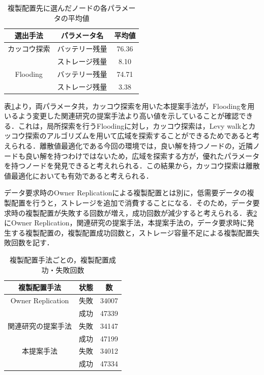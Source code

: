 \documentclass[11pt]{jreport}
\begin{document}
\begin{table}[H]
	\begin{center}
	\caption{複製配置先に選んだノードの各パラメータの平均値}
	\begin{tabular}{ | c | c | c | } \hline
	選出手法 & パラメータ名 & 平均値 \\ \hline \hline
	カッコウ探索 & バッテリー残量 & 76.36 \\ \cline{2-3}
		     & ストレージ残量 & 8.10 \\ \hline
	Flooding & バッテリー残量 & 74.71 \\ \cline{2-3}
		     & ストレージ残量 & 3.38 \\ \hline
	\end{tabular}
	\label{tab:node}
	\end{center}
\end{table}

\par 表\ref{tab:node}より，両パラメータ共，カッコウ探索を用いた本提案手法が，Floodingを用いるよう変更した関連研究の提案手法より高い値を示していることが確認できる．これは，局所探索を行うFloodingに対し，カッコウ探索は，Levy walkとカッコウ探索のアルゴリズムを用いて広域を探索することができるためであると考えられる．離散値最適化である今回の環境では，良い解を持つノードの，近隣ノードも良い解を持つわけではないため，広域を探索する方が，優れたパラメータを持つノードを発見できると考えれられる．この結果から，カッコウ探索は離散値最適化においても有効であると考えられる．
\par データ要求時のOwner Replicationによる複製配置とは別に，低需要データの複製配置を行うと，ストレージを追加で消費することになる．そのため，データ要求時の複製配置が失敗する回数が増え，成功回数が減少すると考えられる．表\ref{tab:num}にOwner Replication，関連研究の提案手法，本提案手法の，データ要求時に発生する複製配置の，複製配置成功回数と，ストレージ容量不足による複製配置失敗回数を記す．

\begin{table}[H]
	\begin{center}
	\caption{複製配置手法ごとの，複製配置成功・失敗回数}
	\begin{tabular}{ | c | c | c | } \hline
	複製配置手法 & 状態 & 数 \\ \hline \hline
	Owner Replication & 失敗 & 34007 \\ \cline{2-3}
		     & 成功 & 47339 \\ \hline
	関連研究の提案手法 & 失敗 & 34147 \\ \cline{2-3}
		     & 成功 & 47199 \\ \hline
       	本提案手法 & 失敗 & 34012 \\ \cline{2-3}
		     & 成功 & 47334 \\ \hline
	\end{tabular}
	\label{tab:num}
	\end{center}
\end{table}
\end{document}

